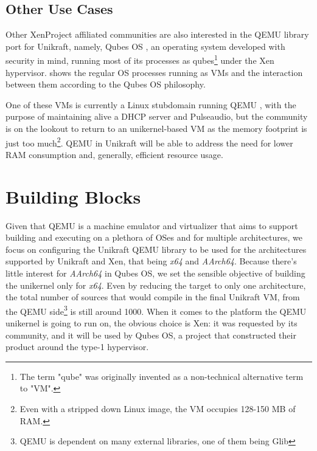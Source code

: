 \subsection{Other Use Cases}
\label{subsec:other-usecases}

Other XenProject affiliated communities are also interested in the QEMU library port for Unikraft, namely, Qubes OS \cite{qubes-os}, an operating system developed with security in mind, running most of its processes as qubes\footnote{The term "qube" was originally invented as a non-technical alternative term to "VM".} under the Xen hypervisor.
 shows the regular OS processes running as VMs and the interaction between them according to the Qubes OS philosophy.


One of these VMs is currently a Linux stubdomain running QEMU \cite{qubes-os-linux-stubdom}, with the purpose of maintaining alive a DHCP server and Pulseaudio, but the community is on the lookout to return to an unikernel-based VM as the memory footprint is just too much\footnote{Even with a stripped down Linux image, the VM occupies 128-150 MB of RAM.}.
QEMU in Unikraft will be able to address the need for lower RAM consumption and, generally, efficient resource usage.

\section{Building Blocks}
\label{sec:building-blocks}

Given that QEMU is a machine emulator and virtualizer that aims to support building and executing on a plethora of OSes and for multiple architectures, we focus on configuring the Unikraft QEMU library to be used for the architectures supported by Unikraft and Xen, that being \textit{x64} and \textit{AArch64}.
Because there's little interest for \textit{AArch64} in Qubes OS, we set the sensible objective of building the unikernel only for \textit{x64}.
Even by reducing the target to only one architecture, the total number of sources that would compile in the final Unikraft VM, from the QEMU side\footnote{QEMU is dependent on many external libraries, one of them being Glib} is still around 1000.
When it comes to the platform the QEMU unikernel is going to run on, the obvious choice is Xen: it was requested by its community, and it will be used by Qubes OS, a project that constructed their product around the type-1 hypervisor.

